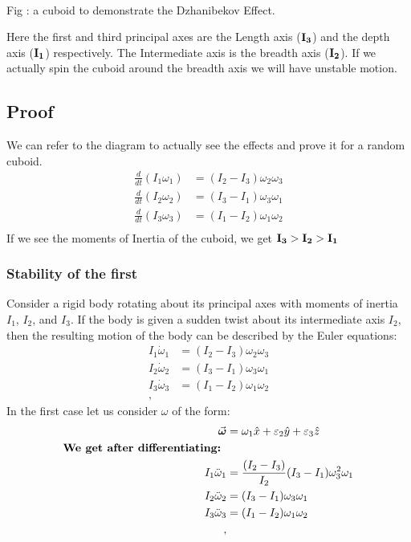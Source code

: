 \documentclass{article}
\begin{document}
\begin{center}
\\
Fig : a cuboid to demonstrate the Dzhanibekov Effect.
\end{center}
Here the first and third principal axes are the Length axis ($\vb{I_3}$) and the depth axis ($\vb{I_1}$) respectively. The Intermediate axis is the breadth axis ($\vb{I_2}$). If we actually spin the cuboid around the breadth axis we will have unstable motion. 
\subsection{Proof}
We can refer to the diagram to actually see the effects and prove it for a random cuboid.
\begin{align*}
    \frac{d}{dt}\left(I_1\omega_1\right) &=  (I_2 - I_3)\omega_2\omega_3  \\
    \frac{d}{dt}\left(I_2\omega_2\right) &=  (I_3 - I_1)\omega_3\omega_1      \\
    \frac{d}{dt}\left(I_3\omega_3\right) &=  (I_1 - I_2)\omega_1\omega_2      \\
\end{align*}
If we see the moments of Inertia of the cuboid, we get $\vb{I_3}>\vb{I_2}>\vb{I_1}$
\subsubsection{Stability of the first }
Consider a rigid body rotating about its principal axes with moments of inertia $I_1$, $I_2$, and $I_3$. If the body is given a sudden twist about its intermediate axis $I_2$, then the resulting motion of the body can be described by the Euler equations:
\begin{align}
I_1 \dot{\omega}_1 &= (I_2 - I_3)\omega_2 \omega_3  \\
I_2 \dot{\omega}_2 &= (I_3 - I_1)\omega_3 \omega_1  \\
I_3 \dot{\omega}_3 &=  (I_1 - I_2)\omega_1 \omega_2  \\,
\end{align}
In the first case let us consider $\omega$ of the form:
\begin{align*}
    \va*{\omega} &= \omega_1 \hat{x} + \varepsilon_2 \hat{y} + \varepsilon_3 \hat{z}\\
    \textbf{We get after differentiating: }\\
    I_1 \ddot{\omega}_1 &= \frac{(I_2 - I_3)}{I_2}(I_3 - I_1)\omega_3^2 \omega_1 \\
    I_2 \ddot{\omega}_2 &= (I_3 - I_1)\omega_3 \omega_1  \\
    I_3 \ddot{\omega}_3 &=  (I_1 - I_2)\omega_1 \omega_2  \\,
\end{align*}
\end{document}
